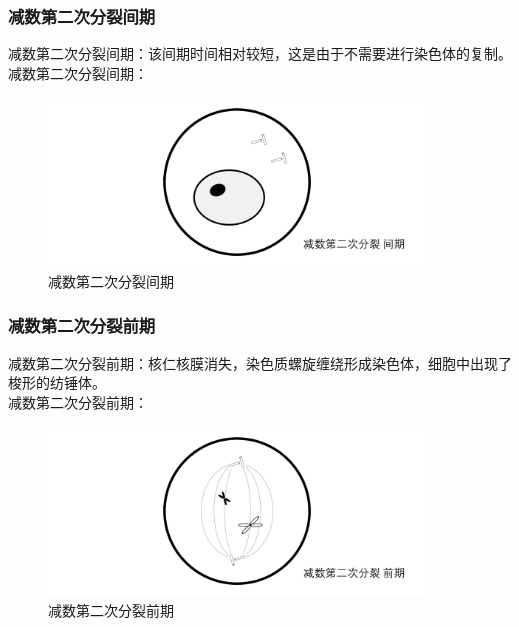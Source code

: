 \documentclass[UTF8]{ctexart}
\begin{document}
\subsubsection{减数第二次分裂间期}
    减数第二次分裂间期：该间期时间相对较短，这是由于不需要进行染色体的复制。\\[4mm]
    减数第二次分裂间期：
    \begin{figure}[h]
        \begin{center}
            \includegraphics[width=10cm]{BiologyImage/39.jpg}
            \caption{减数第二次分裂间期}
        \end{center}
    \end{figure}

\subsubsection{减数第二次分裂前期}
    减数第二次分裂前期：核仁核膜消失，染色质螺旋缠绕形成染色体，细胞中出现了梭形的纺锤体。\\[4mm]
    减数第二次分裂前期：
    \begin{figure}[h]
        \begin{center}
            \includegraphics[width=10cm]{BiologyImage/40.jpg}
            \caption{减数第二次分裂前期}
        \end{center}
    \end{figure}

\newpage
\end{document}
